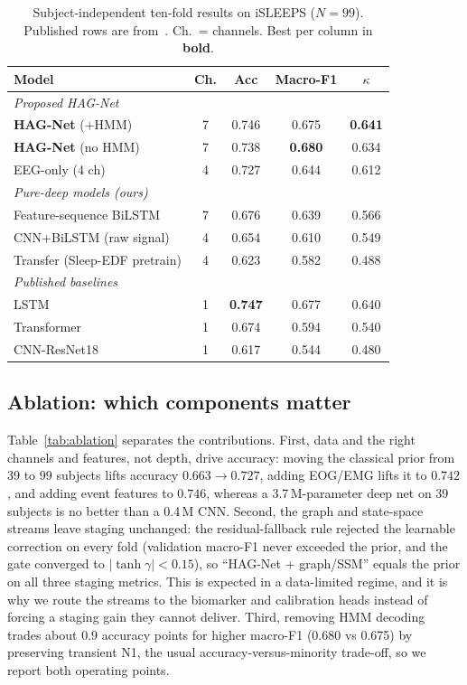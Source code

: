 \documentclass[journal]{IEEEtran}
\newcommand{\hagAccR}{0.738}   %
\newcommand{\hagMfR}{0.680}    %
\newcommand{\hagKR}{0.634}     %
\newcommand{\hagAccH}{0.746}   %
\newcommand{\hagMfH}{0.675}    %
\newcommand{\hagKH}{0.641}     %
\begin{document}
\begin{table}[t]
\caption{Subject-independent ten-fold results on iSLEEPS ($N=99$). Published rows
are from~\cite{maiti2026isleeps}. Ch.\ = channels. Best per column in \textbf{bold}.}
\label{tab:main}
\centering
\setlength{\tabcolsep}{4pt}
\begin{tabular}{lcccc}
\toprule
Model & Ch. & Acc & Macro-F1 & $\kappa$ \\
\midrule
\multicolumn{5}{l}{\emph{Proposed HAG-Net}}\\
\textbf{HAG-Net} (+HMM)           & 7 & \hagAccH & \hagMfH & \textbf{\hagKH} \\
\textbf{HAG-Net} (no HMM)         & 7 & \hagAccR & \textbf{\hagMfR} & \hagKR \\
\;\; EEG-only (4 ch)              & 4 & 0.727 & 0.644 & 0.612 \\
\midrule
\multicolumn{5}{l}{\emph{Pure-deep models (ours)}}\\
Feature-sequence BiLSTM           & 7 & 0.676 & 0.639 & 0.566 \\
CNN+BiLSTM (raw signal)           & 4 & 0.654 & 0.610 & 0.549 \\
Transfer (Sleep-EDF pretrain)     & 4 & 0.623 & 0.582 & 0.488 \\
\midrule
\multicolumn{5}{l}{\emph{Published baselines~\cite{maiti2026isleeps}}}\\
LSTM                              & 1 & \textbf{0.747} & 0.677 & 0.640 \\
Transformer                       & 1 & 0.674 & 0.594 & 0.540 \\
CNN-ResNet18                      & 1 & 0.617 & 0.544 & 0.480 \\
\bottomrule
\end{tabular}
\end{table}

\subsection{Ablation: which components matter}
\label{sec:ablation}
Table~\ref{tab:ablation} separates the contributions. First, data and the right
channels and features, not depth, drive accuracy: moving the classical prior from
39 to 99 subjects lifts accuracy $0.663\!\rightarrow\!0.727$, adding EOG/EMG lifts
it to $0.742$, and adding event features to $0.746$, whereas a 3.7\,M-parameter
deep net on 39 subjects is no better than a 0.4\,M CNN. Second, the graph and
state-space streams leave staging unchanged: the residual-fallback rule rejected
the learnable correction on every fold (validation macro-F1 never exceeded the
prior, and the gate converged to $|\tanh\gamma|<0.15$), so ``HAG-Net + graph/SSM''
equals the prior on all three staging metrics. This is expected in a data-limited
regime, and it is why we route the streams to the biomarker and calibration heads
instead of forcing a staging gain they cannot deliver. Third, removing HMM decoding
trades about 0.9 accuracy points for higher macro-F1 (0.680 vs 0.675) by preserving
transient N1, the usual accuracy-versus-minority trade-off, so we report both
operating points.
\end{document}
